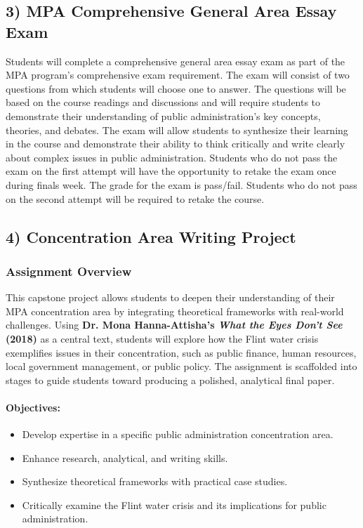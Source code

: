 \documentclass[12pt, letterpaper]{article}
\begin{document}
\subsection*{3) MPA Comprehensive General Area Essay Exam}

Students will complete a comprehensive general area essay exam as part of the MPA program's comprehensive exam requirement. The exam will consist of two questions from which students will choose one to answer. The questions will be based on the course readings and discussions and will require students to demonstrate their understanding of public administration's key concepts, theories, and debates. The exam will allow students to synthesize their learning in the course and demonstrate their ability to think critically and write clearly about complex issues in public administration. Students who do not pass the exam on the first attempt will have the opportunity to retake the exam once during finals week. The grade for the exam is pass/fail. Students who do not pass on the second attempt will be required to retake the course.

\subsection*{4) Concentration Area Writing Project}

\subsubsection*{Assignment Overview}

This capstone project allows students to deepen their understanding of their MPA concentration area by integrating theoretical frameworks with real-world challenges. Using \textbf{Dr. Mona Hanna-Attisha's \textit{What the Eyes Don’t See} (2018)} as a central text, students will explore how the Flint water crisis exemplifies issues in their concentration, such as public finance, human resources, local government management, or public policy. The assignment is scaffolded into stages to guide students toward producing a polished, analytical final paper.

\paragraph*{Objectives:}
\begin{itemize}
    \item Develop expertise in a specific public administration concentration area.
    \item Enhance research, analytical, and writing skills.
    \item Synthesize theoretical frameworks with practical case studies.
    \item Critically examine the Flint water crisis and its implications for public administration.
\end{itemize}
\end{document}
